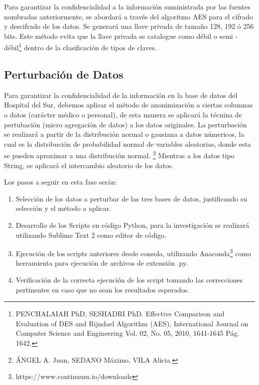 \documentclass[a4paper,openright,12pt]{book}
\theoremstyle{definition}
\theoremstyle{remark}
\begin{document}
Para garantizar la confidencialidad a la información suministrada por las fuentes nombradas anteriormente, se abordará a través del algoritmo AES para el cifrado y descifrado de los datos. Se generará una llave privada de tamaño 128, 192 ó 256 bits. Este método evita que la llave privada se catalogue como débil o semi - débil\footnote{PENCHALAIAH PhD, SESHADRI  PhD. Effective Comparison and Evaluation of DES and Rijndael Algorithm (AES), International Journal on Computer Science and Engineering Vol. 02, No. 05, 2010, 1641-1645 Pág. 1642.} dentro de la clasificación de tipos de claves.
    
    \subsection{Perturbación de Datos}
     Para garantizar la confidencialidad de la información en la base de datos del Hospital del Sur, debemos aplicar el método de anonimización a ciertas columnas o datos (carácter médico o personal), de esta manera se aplicará la técnina de pertubación (micro agregación de datos) a los datos originales. La perturbación se realizará a partir de la distribución normal o gausiana a datos númericos, la cual es la distribución de probabilidad normal de variables aleatorias, donde esta se pueden aproximar a una distribución normal. \footnote{ÁNGEL A. Juan, SEDANO Máximo, VILA Alicia.} %
Mientras a los datos tipo String, se aplicará el intercambio aleatorio de los datos.

Los pasos a seguir en esta fase serán:
\begin{enumerate}
	\item Selección de los datos a perturbar de las tres bases de datos, justificando su selección y el método a aplicar.
    \item Desarrollo de los Scripts en código Python, para la investigación se realizará utilizando Sublime Text 2 como editor de código.
    \item Ejecución de los scripts anteriores desde consola, utilizando Anaconda\footnote{https://www.continuum.io/downloads} como herramienta para ejecución de archivos de extensión .py.
    \item Verificación de la correcta ejecución de los script tomando las correcciones pertinentes en caso que no sean los resultados esperados.
\end{enumerate}
\end{document}
